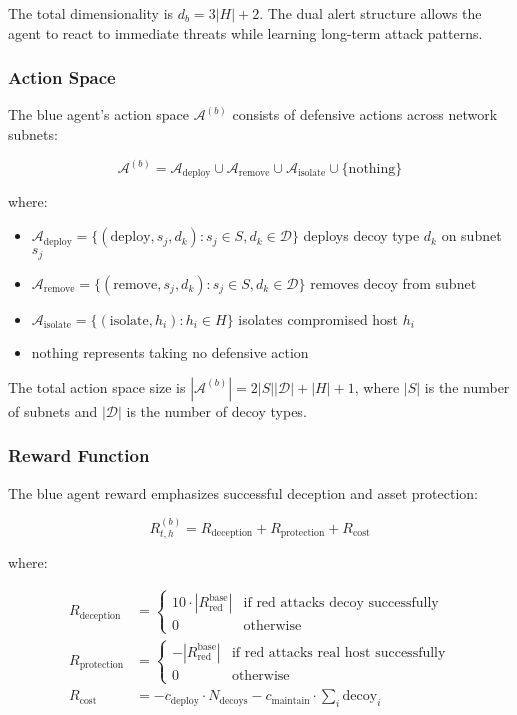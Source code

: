 \documentclass[11pt]{article}
\theoremstyle{definition}
\theoremstyle{plain}
\newcommand{\MC}[1]{\mathcal{#1}}
\begin{document}
The total dimensionality is $d_b = 3|H| + 2$. The dual alert structure allows the agent to react to immediate threats while learning long-term attack patterns.

\subsubsection{Action Space}
The blue agent's action space $\MC{A}^{(b)}$ consists of defensive actions across network subnets:

\begin{equation}
\MC{A}^{(b)} = \MC{A}_{\text{deploy}} \cup \MC{A}_{\text{remove}} \cup \MC{A}_{\text{isolate}} \cup \{\text{nothing}\}
\end{equation}

where:
\begin{itemize}
    \item $\MC{A}_{\text{deploy}} = \{(\text{deploy}, s_j, d_k) : s_j \in S, d_k \in \MC{D}\}$ deploys decoy type $d_k$ on subnet $s_j$
    \item $\MC{A}_{\text{remove}} = \{(\text{remove}, s_j, d_k) : s_j \in S, d_k \in \MC{D}\}$ removes decoy from subnet
    \item $\MC{A}_{\text{isolate}} = \{(\text{isolate}, h_i) : h_i \in H\}$ isolates compromised host $h_i$
    \item $\text{nothing}$ represents taking no defensive action
\end{itemize}

The total action space size is $|\MC{A}^{(b)}| = 2|S||\MC{D}| + |H| + 1$, where $|S|$ is the number of subnets and $|\MC{D}|$ is the number of decoy types.

\subsubsection{Reward Function}
The blue agent reward emphasizes successful deception and asset protection:

\begin{equation}
R_{t,h}^{(b)} = R_{\text{deception}} + R_{\text{protection}} + R_{\text{cost}}
\end{equation}

where:

\begin{align}
R_{\text{deception}} &= \begin{cases}
10 \cdot |R_{\text{red}}^{\text{base}}| & \text{if red attacks decoy successfully} \\
0 & \text{otherwise}
\end{cases} \\
R_{\text{protection}} &= \begin{cases}
-|R_{\text{red}}^{\text{base}}| & \text{if red attacks real host successfully} \\
0 & \text{otherwise}
\end{cases} \\
R_{\text{cost}} &= -c_{\text{deploy}} \cdot N_{\text{decoys}} - c_{\text{maintain}} \cdot \sum_{i} \text{decoy}_i
\end{align}
\end{document}
